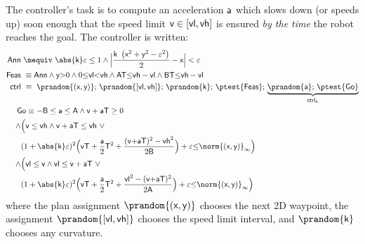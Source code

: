 \documentclass[12pt]{cmuthesis}
\theoremstyle{definition}
\theoremstyle{remark}
\newcommand{\xgivar}{\textsf{xi}}
\newcommand{\ygivar}{\textsf{yi}}
\newcommand{\xgvar}{\textsf{x}}
\newcommand{\ygvar}{\textsf{y}}
\newcommand{\kvar}{\textsf{k}}
\newcommand{\vlvar}{\textsf{vl}}
\newcommand{\vhvar}{\textsf{vh}}
\newcommand{\Tvar}{{\sf T}\xspace}
\newcommand{\Avar}{{\sf A}\xspace}
\newcommand{\Bvar}{{\sf B}\xspace}
\newcommand{\vvar}{{\sf v}\xspace}
\newcommand{\avar}{{\sf a}\xspace}
\newcommand{\ctrl}{\textsf{ctrl}\xspace}
\newcommand{\ctrlliv}{\ctrl_{\text{a}}}
\newcommand{\lnorm}[1]{{{\norm{#1}}_{\infty}}}
\begin{document}
The controller's task is to compute an acceleration $\avar$ which slows down (or speeds up) soon enough that the speed limit $\vvar \in [\vlvar,\vhvar]$ is ensured \emph{by the time} the robot reaches the goal.
The controller is written:
\newcommand{\admiss}{\textsf{Go}} %
\newcommand{\planreq}{\textsf{Feas}} %
\newcommand{\veps}{\varepsilon}
\newcommand{\annul}{\textsf{Ann}\xspace}
\newcommand{\adjustSpeedDist}{\delta_\mathsf{Lim}\xspace}
\newcommand{\controllableGoalDist}{\mathsf{Lim}}
{\small\begin{align*}
\annul &~\mequiv~\abs{\kvar}\veps \leq 1 \land \Big|\frac{ \kvar~\left(\xgvar^2 +\ygvar^2 - \veps^2 \right)}{2} - \xgvar\Big| < \veps\\
\label{eq:planReq} \planreq &~\equiv \annul \land \ygvar{>}0 \land 0{\leq}\vlvar{<}\vhvar \land \Avar\Tvar{\leq}\vhvar-\vlvar \land \Bvar\Tvar{\leq}\vhvar-\vlvar\\
\ctrl &~\equiv~ \prandom{(\xgvar,\ygvar)};\,\prandom{[\vlvar,\vhvar]};\,\prandom{\kvar};\,\ptest{\planreq};\,\underbrace{\prandom{\avar};\,\ptest{\admiss}}_{\ctrlliv}\\
      ~&\hspace*{-5pt}\admiss \equiv-\Bvar\leq \avar \leq\Avar \land \vvar + \avar\Tvar \geq 0 \\
\land & \Bigl(\vvar \leq \vhvar \land \vvar+\avar\Tvar\leq \vhvar ~\lor \\
      & (1+\abs{\kvar}\veps)^2 \Bigl(\vvar\Tvar+\frac{\avar}{2}\Tvar^2 + \frac{(\vvar{+}\avar\Tvar)^2-\vhvar^2}{2\Bvar}\Bigr) + \veps{\leq}\lnorm{(\xgvar,\ygvar)} \Bigr)\\
\land & \Bigl(\vlvar \leq \vvar \land \vlvar \leq \vvar+\avar\Tvar ~\lor\\
      & (1+\abs{\kvar}\veps)^2 \Bigl(\vvar\Tvar+\frac{\avar}{2}\Tvar^2 + \frac{\vlvar^2 - (\vvar{+}\avar\Tvar)^2}{2\Avar}\Bigr) + \veps{\leq}\lnorm{(\xgvar,\ygvar)}\Bigr)\end{align*}}
\noindent where the plan assignment $\prandom{(\xgvar,\ygvar)}$ chooses the next 2D waypoint, the assignment $\prandom{[\vlvar,\vhvar]}$ chooses the speed limit interval, and $\prandom{\kvar}$ chooses any curvature.
\end{document}
